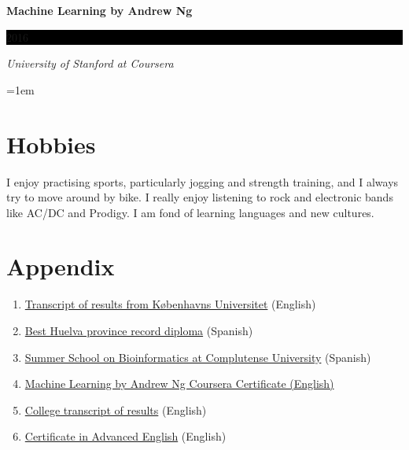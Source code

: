 \documentclass[paper=a4,fontsize=11pt]{article} %
\newcommand{\sepspace}{\vspace*{1em}}		%
\newcommand{\NewPart}[1]{\section*{
									{#1}}}
\newcommand{\EducationEntry}[4]{
		\noindent \textbf{#1} \hfill      %
		\colorbox{Black}{%
			\parbox{6em}{%
			\hfill\color{White}#2}} \par  %
		\noindent \textit{#3} \par        %
		\noindent\hangindent=1em\hangafter=0 \small #4 %
		\normalsize \par}
\newcommand{\AwardEntry}[4]{
		\noindent \textbf{#1} \hfill      %
		\colorbox{Black}{%
			\parbox{3em}{%
			\hfill\color{White}#2}} \par  %
		\noindent \textit{#3} \par        %
		  \noindent\hangindent=1em\hangafter=0 \small #4  %
		\normalsize \par}
\begin{document}
\AwardEntry{Machine Learning by Andrew Ng}{2016}{University of Stanford at Coursera}{}






%
%


\NewPart{Hobbies}
I enjoy practising sports, particularly jogging and strength training, and I always try to move around by bike. I really enjoy listening to rock and electronic bands like AC/DC and Prodigy. I am fond of learning languages and new cultures.





\NewPart{Appendix}
\begin{enumerate}

\item \hyperlink{KU_transcript}{Transcript of results from K{\o}benhavns Universitet} (English)

\item \hyperlink{premio_extraordinario}{Best Huelva province record diploma} (Spanish)
\item \hyperlink{complu}{Summer School on Bioinformatics at Complutense University} (Spanish)

\item \hyperlink{ML-Coursera}{Machine Learning by Andrew Ng Coursera Certificate (English)}

\item \hyperlink{exp-en}{College transcript of results} (English)
\item \hyperlink{cae}{Certificate in Advanced English} (English)
\end{enumerate}
%



\end{document}
